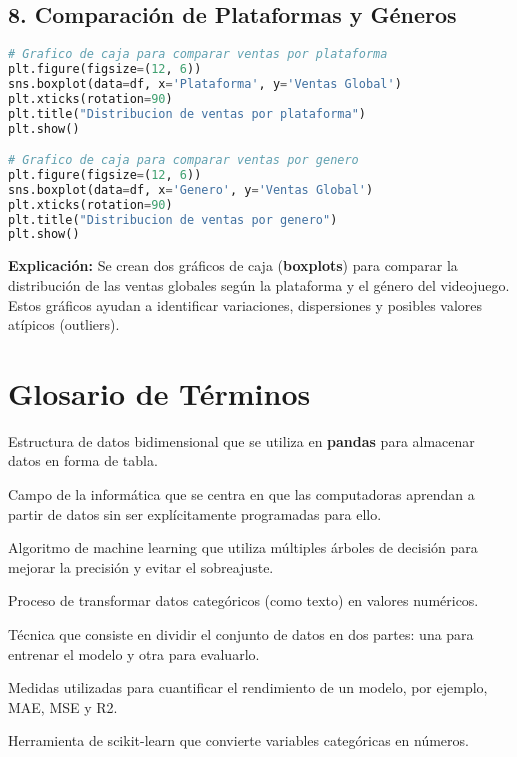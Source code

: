 \documentclass[12pt]{article}
\begin{document}
\subsection{8. Comparación de Plataformas y Géneros}
\begin{lstlisting}[language=Python]
# Grafico de caja para comparar ventas por plataforma
plt.figure(figsize=(12, 6))
sns.boxplot(data=df, x='Plataforma', y='Ventas Global')
plt.xticks(rotation=90)
plt.title("Distribucion de ventas por plataforma")
plt.show()

# Grafico de caja para comparar ventas por genero
plt.figure(figsize=(12, 6))
sns.boxplot(data=df, x='Genero', y='Ventas Global')
plt.xticks(rotation=90)
plt.title("Distribucion de ventas por genero")
plt.show()
\end{lstlisting}
\textbf{Explicación:}  
Se crean dos gráficos de caja (\textbf{boxplots}) para comparar la distribución de las ventas globales según la plataforma y el género del videojuego. Estos gráficos ayudan a identificar variaciones, dispersiones y posibles valores atípicos (outliers).

\section{Glosario de Términos}
\begin{description}[style=nextline]
    \item[DataFrame:] Estructura de datos bidimensional que se utiliza en \textbf{pandas} para almacenar datos en forma de tabla.
    \item[Machine Learning:] Campo de la informática que se centra en que las computadoras aprendan a partir de datos sin ser explícitamente programadas para ello.
    \item[Random Forest:] Algoritmo de machine learning que utiliza múltiples árboles de decisión para mejorar la precisión y evitar el sobreajuste.
    \item[Encoding:] Proceso de transformar datos categóricos (como texto) en valores numéricos.
    \item[Train-Test Split:] Técnica que consiste en dividir el conjunto de datos en dos partes: una para entrenar el modelo y otra para evaluarlo.
    \item[Métricas de Evaluación:] Medidas utilizadas para cuantificar el rendimiento de un modelo, por ejemplo, MAE, MSE y R2.
    \item[LabelEncoder:] Herramienta de scikit-learn que convierte variables categóricas en números.
\end{description}
\end{document}
